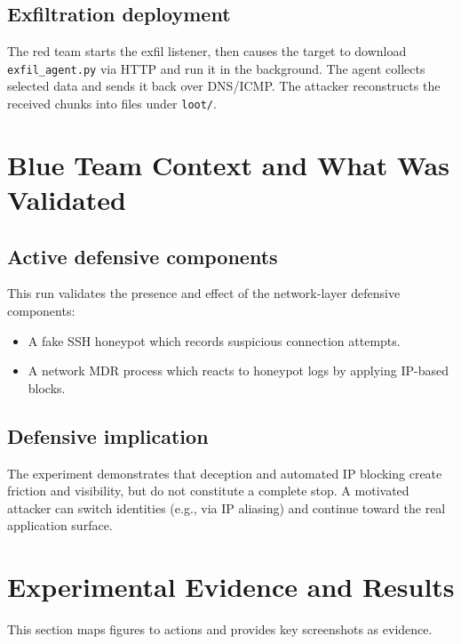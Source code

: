 \documentclass[11pt]{article}
\begin{document}
\subsection{Exfiltration deployment}
The red team starts the exfil listener, then causes the target to download \texttt{exfil\_agent.py} via HTTP and run it in the background. The agent collects selected data and sends it back over DNS/ICMP. The attacker reconstructs the received chunks into files under \texttt{loot/}.

\section{Blue Team Context and What Was Validated}

\subsection{Active defensive components}
This run validates the presence and effect of the network-layer defensive components:
\begin{itemize}[leftmargin=*]
  \item A fake SSH honeypot which records suspicious connection attempts.
  \item A network MDR process which reacts to honeypot logs by applying IP-based blocks.
\end{itemize}

\subsection{Defensive implication}
The experiment demonstrates that deception and automated IP blocking create friction and visibility, but do not constitute a complete stop. A motivated attacker can switch identities (e.g., via IP aliasing) and continue toward the real application surface.

\section{Experimental Evidence and Results}

This section maps figures to actions and provides key screenshots as evidence.
\end{document}
